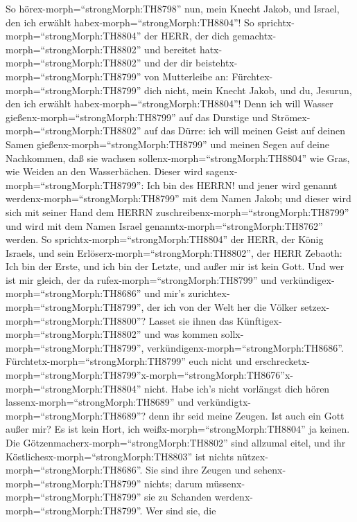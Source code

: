  So hörex-morph=``strongMorph:TH8798'' nun, mein Knecht
Jakob, und Israel, den ich erwählt habex-morph=``strongMorph:TH8804''!
 So sprichtx-morph=``strongMorph:TH8804'' der HERR, der dich
gemachtx-morph=``strongMorph:TH8802'' und bereitet
hatx-morph=``strongMorph:TH8802'' und der dir
beistehtx-morph=``strongMorph:TH8799'' von Mutterleibe an:
Fürchtex-morph=``strongMorph:TH8799'' dich nicht, mein Knecht Jakob, und
du, Jesurun, den ich erwählt habex-morph=``strongMorph:TH8804''!
 Denn ich will Wasser gießenx-morph=``strongMorph:TH8799''
auf das Durstige und Strömex-morph=``strongMorph:TH8802'' auf das Dürre:
ich will meinen Geist auf deinen Samen
gießenx-morph=``strongMorph:TH8799'' und meinen Segen auf deine
Nachkommen,  daß sie wachsen
sollenx-morph=``strongMorph:TH8804'' wie Gras, wie Weiden an den
Wasserbächen.  Dieser wird
sagenx-morph=``strongMorph:TH8799'': Ich bin des HERRN! und jener wird
genannt werdenx-morph=``strongMorph:TH8799'' mit dem Namen Jakob; und
dieser wird sich mit seiner Hand dem HERRN
zuschreibenx-morph=``strongMorph:TH8799'' und wird mit dem Namen Israel
genanntx-morph=``strongMorph:TH8762'' werden.  So
sprichtx-morph=``strongMorph:TH8804'' der HERR, der König Israels, und
sein Erlöserx-morph=``strongMorph:TH8802'', der HERR Zebaoth: Ich bin
der Erste, und ich bin der Letzte, und außer mir ist kein Gott.
 Und wer ist mir gleich, der da
rufex-morph=``strongMorph:TH8799'' und
verkündigex-morph=``strongMorph:TH8686'' und mir's
zurichtex-morph=``strongMorph:TH8799'', der ich von der Welt her die
Völker setzex-morph=``strongMorph:TH8800''? Lasset sie ihnen das
Künftigex-morph=``strongMorph:TH8802'' und was kommen
sollx-morph=``strongMorph:TH8799'',
verkündigenx-morph=``strongMorph:TH8686''. 
Fürchtetx-morph=``strongMorph:TH8799'' euch nicht und
erschrecketx-morph=``strongMorph:TH8799''\textbar x-morph=``strongMorph:TH8676''x-morph=``strongMorph:TH8804''
nicht. Habe ich's nicht vorlängst dich hören
lassenx-morph=``strongMorph:TH8689'' und
verkündigtx-morph=``strongMorph:TH8689''? denn ihr seid meine Zeugen.
Ist auch ein Gott außer mir? Es ist kein Hort, ich
weißx-morph=``strongMorph:TH8804'' ja keinen.  Die
Götzenmacherx-morph=``strongMorph:TH8802'' sind allzumal eitel, und ihr
Köstlichesx-morph=``strongMorph:TH8803'' ist nichts
nützex-morph=``strongMorph:TH8686''. Sie sind ihre Zeugen und
sehenx-morph=``strongMorph:TH8799'' nichts; darum
müssenx-morph=``strongMorph:TH8799'' sie zu Schanden
werdenx-morph=``strongMorph:TH8799''.  Wer sind sie, die
